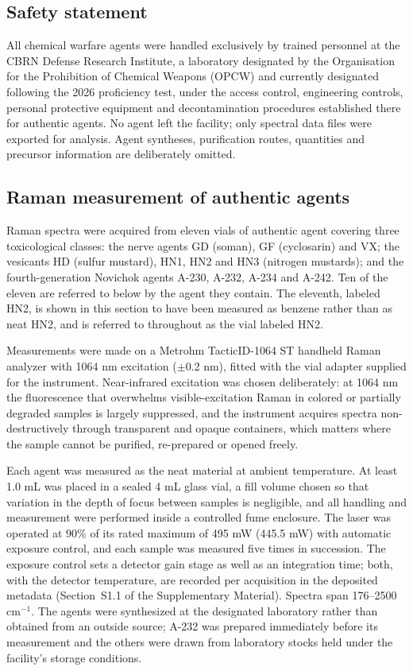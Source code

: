 \documentclass[review,12pt]{elsarticle}
\newcommand*\wn{\ensuremath{\text{cm}^{-1}}}
\begin{document}
\subsection{Safety statement}

All chemical warfare agents were handled exclusively by trained personnel at the CBRN Defense Research Institute, a laboratory designated by the Organisation for the Prohibition of Chemical Weapons (OPCW) and currently designated following the 2026 proficiency test, under the access control, engineering controls, personal protective equipment\cite{ticcwaref} and decontamination procedures established there for authentic agents. No agent left the facility; only spectral data files were exported for analysis. Agent syntheses, purification routes, quantities and precursor information are deliberately omitted.

\subsection{Raman measurement of authentic agents}

Raman spectra were acquired from eleven vials of authentic agent covering three toxicological classes: the nerve agents GD (soman), GF (cyclosarin) and VX; the vesicants HD (sulfur mustard), HN1, HN2 and HN3 (nitrogen mustards); and the fourth-generation Novichok agents A-230, A-232, A-234 and A-242. Ten of the eleven are referred to below by the agent they contain. The eleventh, labeled HN2, is shown in this section to have been measured as benzene rather than as neat HN2, and is referred to throughout as the vial labeled HN2.\cite{kloske2019novichoks,noga2023novichoks}

Measurements were made on a Metrohm TacticID-1064 ST handheld Raman analyzer with 1064 nm excitation ($\pm$0.2 nm), fitted with the vial adapter supplied for the instrument. Near-infrared excitation was chosen deliberately: at 1064 nm the fluorescence that overwhelms visible-excitation Raman in colored or partially degraded samples is largely suppressed, and the instrument acquires spectra non-destructively through transparent and opaque containers, which matters where the sample cannot be purified, re-prepared or opened freely.

Each agent was measured as the neat material at ambient temperature. At least 1.0 mL was placed in a sealed 4 mL glass vial, a fill volume chosen so that variation in the depth of focus between samples is negligible, and all handling and measurement were performed inside a controlled fume enclosure. The laser was operated at 90\% of its rated maximum of 495 mW (445.5 mW) with automatic exposure control, and each sample was measured five times in succession. The exposure control sets a detector gain stage as well as an integration time; both, with the detector temperature, are recorded per acquisition in the deposited metadata (Section~S1.1 of the Supplementary Material). Spectra span 176--2500 \wn{}. The agents were synthesized at the designated laboratory rather than obtained from an outside source; A-232 was prepared immediately before its measurement and the others were drawn from laboratory stocks held under the facility's storage conditions.
\end{document}
